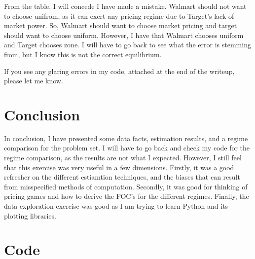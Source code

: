 \documentclass[11pt]{article}
\theoremstyle{definition}
\theoremstyle{remark}
\begin{document}
From the table, I will concede I have made a mistake. Walmart should not want to choose unifrom, as it can exert any pricing regime due to Target's lack of 
market power. So, Walmart should want to choose market pricing and target should want to choose uniform. However, I have that Walmart chooses uniform and 
Target chooses zone. I will have to go back to see what the error is stemming from, but I know this is not the correct equilibrium.

If you see any glaring errors in my code, attached at the end of the writeup, please let me know.

\section{Conclusion}

In conclusion, I have presented some data facts, estimation results, and a regime comparison for the problem set. I will have to go back and check my code for the regime comparison, as the results are not what I expected. 
However, I still feel that this exercise was very useful in a few dimensions. Firstly, it was a good refresher on the different estiamtion techniques, and the biases that can result from misspecified methods of computation.
Secondly, it was good for thinking of pricing games and how to derive the FOC's for the different regimes. Finally, the data exploration exercise was good as I am trying to learn Python and its plotting libraries.

\newpage



\newpage
\appendix

\section{Code}


\end{document}
